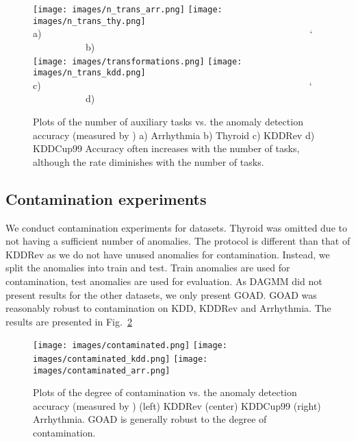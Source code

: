 \documentclass{article} \usepackage{iclr2020_conference,times}
\begin{document}
\begin{figure}[tb]
\begin{center}
\texttt{[image: images/n\_trans\_arr.png]}
\texttt{[image: images/n\_trans\_thy.png]}\\
a)~~~~~~~~~~~~~~~~~~~~~~~~~~~~~~~~~~~~~~~~~~~~~~~~~~~~~~~~`~~~~~~~~~~~~~b)\\
\texttt{[image: images/transformations.png]}
\texttt{[image: images/n\_trans\_kdd.png]}\\
c)~~~~~~~~~~~~~~~~~~~~~~~~~~~~~~~~~~~~~~~~~~~~~~~~~~~~~~~~`~~~~~~~~~~~~~d)\\
\end{center}
\caption{Plots of the number of auxiliary tasks vs. the anomaly detection accuracy (measured by ) a) Arrhythmia b) Thyroid c) KDDRev d) KDDCup99 Accuracy often increases with the number of tasks, although the rate diminishes with the number of tasks.}
\label{fig:transformations}
\end{figure}

\subsection{Contamination experiments}
\label{app:contamination}

We conduct contamination experiments for  datasets. Thyroid was omitted due to not having a sufficient number of anomalies. The protocol is different than that of KDDRev as we do not have unused anomalies for contamination. Instead, we split the anomalies into train and test. Train anomalies are used for contamination, test anomalies are used for evaluation. As DAGMM did not present results for the other datasets, we only present GOAD. GOAD was reasonably robust to contamination on KDD, KDDRev and Arrhythmia. The results are presented in Fig.~\ref{fig:contamination}

\begin{figure}[tb]
\begin{center}
\texttt{[image: images/contaminated.png]}
\texttt{[image: images/contaminated\_kdd.png]}
\texttt{[image: images/contaminated\_arr.png]}\\
\end{center}
\caption{Plots of the degree of contamination vs. the anomaly detection accuracy (measured by ) (left) KDDRev (center) KDDCup99 (right) Arrhythmia.  GOAD is generally robust to the degree of contamination.}
\label{fig:contamination}
\end{figure}
\end{document}
